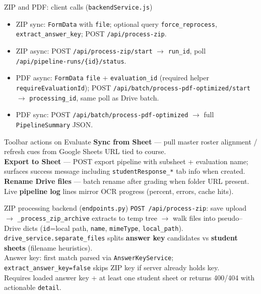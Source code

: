 \documentclass[aspectratio=169]{beamer}
\begin{document}
\begin{frame}{ZIP and PDF: client calls (\texttt{backendService.js})}
  \tiny
  \begin{itemize}\setlength\itemsep{0.12em}
    \item ZIP sync: \texttt{FormData} with \texttt{file}; optional query \texttt{force\_reprocess}, \texttt{extract\_answer\_key}; POST \texttt{/api/process-zip}.
    \item ZIP async: POST \texttt{/api/process-zip/start} $\rightarrow$ \texttt{run\_id}, poll \texttt{/api/pipeline-runs/\{id\}/status}.
    \item PDF async: \texttt{FormData} \texttt{file} + \texttt{evaluation\_id} (required helper \texttt{requireEvaluationId}); POST \texttt{/api/batch/process-pdf-optimized/start} $\rightarrow$ \texttt{processing\_id}, same poll as Drive batch.
    \item PDF sync: POST \texttt{/api/batch/process-pdf-optimized} $\rightarrow$ full \texttt{PipelineSummary} JSON.
  \end{itemize}
\end{frame}

\begin{frame}{Toolbar actions on Evaluate}
  \small
  \textbf{Sync from Sheet} --- pull master roster alignment / refresh cues from Google Sheets URL tied to course.\\
  \textbf{Export to Sheet} --- POST export pipeline with subsheet + evaluation name; surfaces success message including \texttt{studentResponse\_*} tab info when created.\\
  \textbf{Rename Drive files} --- batch rename after grading when folder URL present.\\
  Live \textbf{pipeline log} lines mirror OCR progress (percent, errors, cache hits).
\end{frame}

\begin{frame}{ZIP processing backend (\texttt{endpoints.py})}
  \small
  \texttt{POST /api/process-zip}: save upload $\rightarrow$ \texttt{\_process\_zip\_archive} extracts to temp tree $\rightarrow$ walk files into pseudo--Drive dicts (\texttt{id}=local path, \texttt{name}, \texttt{mimeType}, \texttt{local\_path}).\\
  \texttt{drive\_service.separate\_files} splits \textbf{answer key} candidates vs \textbf{student sheets} (filename heuristics).\\
  Answer key: first match parsed via \texttt{AnswerKeyService}; \texttt{extract\_answer\_key=false} skips ZIP key if server already holds key.\\
  Requires loaded answer key + at least one student sheet or returns 400/404 with actionable \texttt{detail}.
\end{frame}
\end{document}
